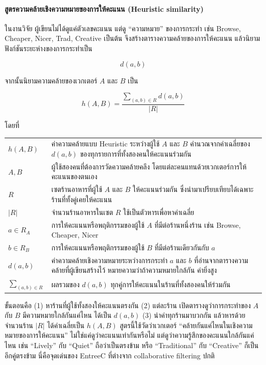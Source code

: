\vspace{1em}
\paragraph{สูตรความคล้ายเชิงความหมายของการให้คะแนน (Heuristic similarity)}
ในงานวิจัย ผู้เขียนไม่ได้ดูแค่ตัวเลขคะแนน แต่ดู ``ความหมาย'' ของการกระทำ
เช่น Browse, Cheaper, Nicer, Trad, Creative เป็นต้น
จึงสร้างตารางความคล้ายของการให้คะแนน
แล้วนิยามฟังก์ชันระยะห่างของการกระทำเป็น

\[
d(a,b)
\]

\noindent จากนั้นนิยามความคล้ายของเวกเตอร์ $A$ และ $B$ เป็น

\begin{equation}
h(A,B)=\frac{\sum_{(a,b)\in R} d(a,b)}{|R|}
\label{eq:h}
\end{equation}

\noindent โดยที่

\noindent
\begin{tabular}{@{}l @{\ :\ } p{}}
$h(A,B)$ & ค่าความคล้ายแบบ Heuristic ระหว่างผู้ใช้ $A$ และ $B$ คำนวณจากค่าเฉลี่ยของ $d(a,b)$ ของทุกรายการที่ทั้งสองคนให้คะแนนร่วมกัน \\
$A, B$ & ผู้ใช้สองคนที่ต้องการวัดความคล้ายคลึง โดยแต่ละคนแทนด้วยเวกเตอร์การให้คะแนนของตนเอง \\
$R$ & เซตร้านอาหารที่ผู้ใช้ $A$ และ $B$ ให้คะแนนร่วมกัน ซึ่งนำมาเปรียบเทียบได้เฉพาะร้านที่ทั้งคู่เคยให้คะแนน \\
$|R|$ & จำนวนร้านอาหารในเซต $R$ ใช้เป็นตัวหารเพื่อหาค่าเฉลี่ย \\
$a \in R_A$ & การให้คะแนนหรือพฤติกรรมของผู้ใช้ $A$ ที่มีต่อร้านหนึ่งร้าน เช่น Browse, Cheaper, Nicer \\
$b \in R_B$ & การให้คะแนนหรือพฤติกรรมของผู้ใช้ $B$ ที่มีต่อร้านเดียวกันกับ $a$ \\
$d(a,b)$ & ค่าความคล้ายเชิงความหมายระหว่างการกระทำ $a$ และ $b$ ที่อ่านจากตารางความคล้ายที่ผู้เขียนสร้างไว้ หมายความว่าถ้าความหมายใกล้กัน ค่ายิ่งสูง \\
$\sum_{(a,b)\in R}$ & ผลรวมของ $d(a,b)$ ทุกคู่การให้คะแนนในร้านที่ทั้งสองคนให้ร่วมกัน \\
\end{tabular}

\bigskip

\noindent ขั้นตอนคือ (1) หาร้านที่ผู้ใช้ทั้งสองให้คะแนนตรงกัน (2) แต่ละร้าน เปิดตารางดูว่าการกระทำของ $A$ กับ $B$ มีความหมายใกล้กันแค่ไหน ได้เป็น $d(a,b)$ (3) นำค่าทุกร้านมาบวกกัน แล้วหารด้วยจำนวนร้าน $|R|$ ได้ค่าเฉลี่ยเป็น $h(A,B)$ สูตรนี้ใช้วัดว่าเวกเตอร์ “คล้ายกันแค่ไหนในเชิงความหมายของการให้คะแนน” ไม่ใช่แค่ดูว่าคะแนนเท่ากันหรือไม่ แต่ดูว่าความรู้สึกของคะแนนใกล้กันแค่ไหน เช่น “Lively” กับ “Quiet” ถือว่าเป็นตรงข้าม หรือ “Traditional” กับ “Creative” ก็เป็นอีกคู่ตรงข้าม นี่คือจุดเด่นของ EntreeC ที่ต่างจาก collaborative filtering ปกติ \cite{hybrid_nd}

